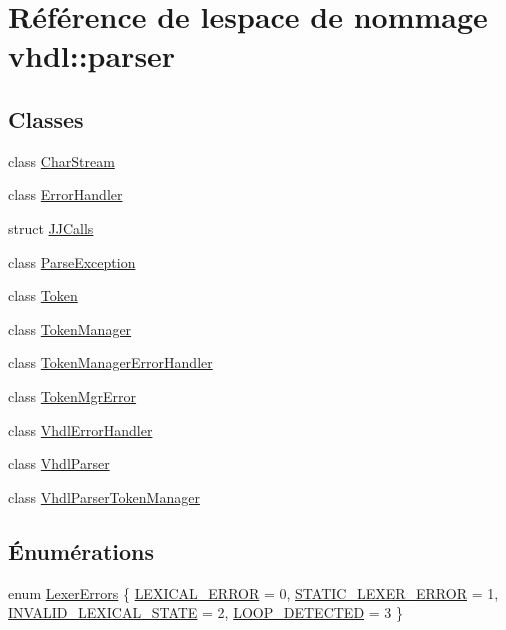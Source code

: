 \hypertarget{namespacevhdl_1_1parser}{}\section{Référence de l\textquotesingle{}espace de nommage vhdl\+:\+:parser}
\label{namespacevhdl_1_1parser}
\subsection*{Classes}
\begin{DoxyCompactItemize}
\item 
class \hyperlink{classvhdl_1_1parser_1_1_char_stream}{Char\+Stream}
\item 
class \hyperlink{classvhdl_1_1parser_1_1_error_handler}{Error\+Handler}
\item 
struct \hyperlink{structvhdl_1_1parser_1_1_j_j_calls}{J\+J\+Calls}
\item 
class \hyperlink{classvhdl_1_1parser_1_1_parse_exception}{Parse\+Exception}
\item 
class \hyperlink{classvhdl_1_1parser_1_1_token}{Token}
\item 
class \hyperlink{classvhdl_1_1parser_1_1_token_manager}{Token\+Manager}
\item 
class \hyperlink{classvhdl_1_1parser_1_1_token_manager_error_handler}{Token\+Manager\+Error\+Handler}
\item 
class \hyperlink{classvhdl_1_1parser_1_1_token_mgr_error}{Token\+Mgr\+Error}
\item 
class \hyperlink{classvhdl_1_1parser_1_1_vhdl_error_handler}{Vhdl\+Error\+Handler}
\item 
class \hyperlink{classvhdl_1_1parser_1_1_vhdl_parser}{Vhdl\+Parser}
\item 
class \hyperlink{classvhdl_1_1parser_1_1_vhdl_parser_token_manager}{Vhdl\+Parser\+Token\+Manager}
\end{DoxyCompactItemize}
\subsection*{Énumérations}
\begin{DoxyCompactItemize}
\item 
enum \hyperlink{namespacevhdl_1_1parser_aafe508f14061aff05b2fd72cbbf9c263}{Lexer\+Errors} \{ \hyperlink{namespacevhdl_1_1parser_aafe508f14061aff05b2fd72cbbf9c263a421efedee0b53d309d53e7cd47e2a641}{L\+E\+X\+I\+C\+A\+L\+\_\+\+E\+R\+R\+O\+R} = 0, 
\hyperlink{namespacevhdl_1_1parser_aafe508f14061aff05b2fd72cbbf9c263a0a754a059e5258ee54de0f5732eded62}{S\+T\+A\+T\+I\+C\+\_\+\+L\+E\+X\+E\+R\+\_\+\+E\+R\+R\+O\+R} = 1, 
\hyperlink{namespacevhdl_1_1parser_aafe508f14061aff05b2fd72cbbf9c263a33431a75f4abe5faadcaa1efdda6b3c9}{I\+N\+V\+A\+L\+I\+D\+\_\+\+L\+E\+X\+I\+C\+A\+L\+\_\+\+S\+T\+A\+T\+E} = 2, 
\hyperlink{namespacevhdl_1_1parser_aafe508f14061aff05b2fd72cbbf9c263a2fb8ecd7243b231c4f0b8d33b67fc817}{L\+O\+O\+P\+\_\+\+D\+E\+T\+E\+C\+T\+E\+D} = 3
 \}
\end{DoxyCompactItemize}
